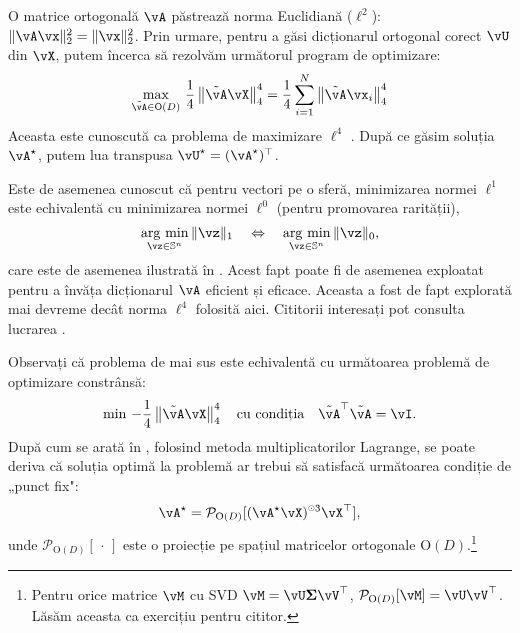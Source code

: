 \documentclass[../../book-main_ro.tex]{subfiles}
\begin{document}
O matrice ortogonală $\vA$ păstrează norma Euclidiană (\(\ell^{2}\)): $\|\vA \vx\|_2^2 = \|\vx\|_2^2$. Prin urmare, pentru a găsi dicționarul ortogonal corect $\vU$ din $\vX$, putem încerca să rezolvăm următorul program de optimizare:
\begin{equation}\label{eq0:orthogonal-dictionary-learning-l4}
    \max_{\tilde{\vA} \in \O(D)}\,
     \frac{1}{4} \norm*{
    \tilde{\vA} \vX
    }_4^4 =  \frac{1}{4} \sum_{i=1}^N \norm*{
        \tilde{\vA} \vx_i
    }_4^4
\end{equation}
Aceasta este cunoscută ca problema de maximizare $\ell^4$ \cite{Zhai-2020}. După ce
găsim soluția \(\vA^{\star}\), putem lua transpusa \(\vU^{\star}
= (\vA^{\star})^{\top}\).
\begin{remark}
    Este de asemenea cunoscut că pentru vectori pe o sferă, minimizarea normei $\ell^1$ este echivalentă cu minimizarea normei $\ell^0$ (pentru promovarea rarității),
\begin{equation*}
            \argmin_{\vz \in \mathbb{S}^n}\|\vz\|_{1}\quad\Leftrightarrow\quad \argmin_{\vz \in \mathbb{S}^n}\|\vz\|_{0},
\end{equation*}
care este de asemenea ilustrată în . Acest fapt poate fi de asemenea exploatat pentru a învăța dicționarul $\vA$ eficient și eficace. Aceasta a fost de fapt explorată mai devreme decât norma $\ell^4$ folosită aici. Cititorii interesați pot consulta lucrarea \cite{qu2020findingsparsestvectorssubspace}.
\end{remark}

Observați că problema de mai sus este echivalentă cu următoarea problemă de optimizare constrânsă:
\begin{equation}\label{eq:orthogonal-dictionary-learning-l4}
    \min\,
    -   \frac{1}{4} \norm*{
    \tilde{\vA} \vX
    }_4^4 \quad \mbox{cu condiția} \quad  \tilde{\vA}^\top\tilde{\vA} = \vI.
\end{equation}
După cum se arată în \cite{Wright-Ma-2022}, folosind metoda multiplicatorilor Lagrange, se poate deriva că soluția optimă la problemă ar trebui să satisfacă următoarea 
condiție de „punct fix":
\begin{equation}
    \vA^{\star} = \mathcal{P}_{\mathrm O(D)}[( {\vA^{\star} \vX})^{\hada 3}\vX^\top],
\end{equation}
unde $\mathcal{P}_{\mathrm O(D)}[\,\cdot\,]$ este o proiecție pe spațiul
matricelor ortogonale $\mathrm O(D)$.\footnote{Pentru orice matrice $\vM$ cu SVD $\vM = \vU\bm \Sigma \vV^\top$, $\mathcal{P}_{\mathrm O(D)}[\vM] = \vU \vV^\top$. Lăsăm aceasta ca exercițiu pentru cititor.} 
\end{document}
